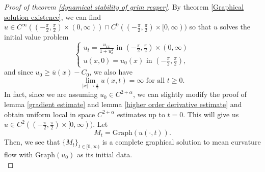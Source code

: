 \documentclass[pdflatex,sn-mathphys-num]{sn-jnl}%
\begin{document}
\begin{proof}[Proof of theorem \ref{dynamical stability of grim reaper}]
    By theorem \ref{Graphical solution existence}, we can find $u \in C^{\infty}((-\frac{\pi}{2}, \frac{\pi}{2})\times (0, \infty))\cap C^0((-\frac{\pi}{2}, \frac{\pi}{2})\times [0, \infty))$ so that $u$ solves the initial value problem
\begin{equation}
    \begin{cases}
        u_t = \frac{u_{xx}}{1 + u_x^2} \text{ in }(-\frac{\pi}{2},\frac{\pi}{2}) \times (0, \infty) \\ 
        u(x,0) = u_0(x) \text{ in }(-\frac{\pi}{2}, \frac{\pi}{2}),
    \end{cases}
\end{equation}
and since $u_0 \geq \overline{u}(x) - C_0$, we also have
\begin{equation}\label{nice behavior at infinity 1d}
    \lim_{|x| \to \frac{\pi}{2}}u(x, t) = \infty \text{ for all }t\geq 0.
\end{equation}
In fact, since we are assuming $u_0 \in C^{2+ \alpha}$, we can slightly modify the proof of lemma \ref{gradient estimate} and lemma \ref{higher order derivative estimate} and obtain uniform local in space $C^{2+\alpha}$ estimates up to $t = 0$. This will give us $u \in C^2((-\frac{\pi}{2}, \frac{\pi}{2})\times [0, \infty))$. Let 
\begin{equation}
    M_t = \text{Graph}(u(\cdot, t)).
\end{equation}
Then, we see that $\{M_t\}_{t \in [0, \infty)}$ is a complete graphical solution to mean curvature flow with $\text{Graph}(u_0)$ as its initial data.\\


\end{proof}
\end{document}
